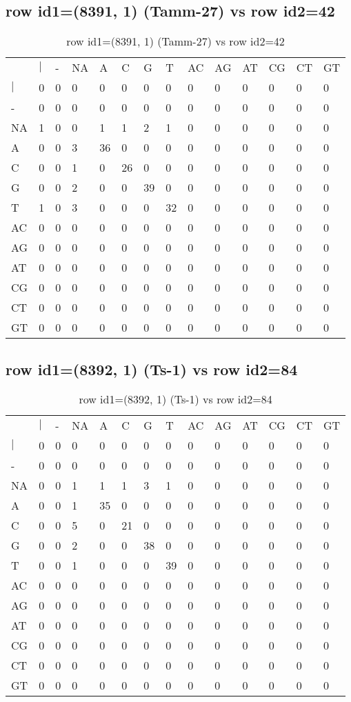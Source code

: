 \subsection{row id1=(8391, 1) (Tamm-27) vs row id2=42}
\begin{center}
\begin{longtable}{|l|l|l|l|l|l|l|l|l|l|l|l|l|l|}
\caption{row id1=(8391, 1) (Tamm-27) vs row id2=42} \label{table_dm442}\\
\hline
\\
\hline
&$|$&-&NA&A&C&G&T&AC&AG&AT&CG&CT&GT\\
$|$&0&0&0&0&0&0&0&0&0&0&0&0&0\\
-&0&0&0&0&0&0&0&0&0&0&0&0&0\\
NA&1&0&0&1&1&2&1&0&0&0&0&0&0\\
A&0&0&3&36&0&0&0&0&0&0&0&0&0\\
C&0&0&1&0&26&0&0&0&0&0&0&0&0\\
G&0&0&2&0&0&39&0&0&0&0&0&0&0\\
T&1&0&3&0&0&0&32&0&0&0&0&0&0\\
AC&0&0&0&0&0&0&0&0&0&0&0&0&0\\
AG&0&0&0&0&0&0&0&0&0&0&0&0&0\\
AT&0&0&0&0&0&0&0&0&0&0&0&0&0\\
CG&0&0&0&0&0&0&0&0&0&0&0&0&0\\
CT&0&0&0&0&0&0&0&0&0&0&0&0&0\\
GT&0&0&0&0&0&0&0&0&0&0&0&0&0\\
\hline
\end{longtable}
\end{center}

\subsection{row id1=(8392, 1) (Ts-1) vs row id2=84}
\begin{center}
\begin{longtable}{|l|l|l|l|l|l|l|l|l|l|l|l|l|l|}
\caption{row id1=(8392, 1) (Ts-1) vs row id2=84} \label{table_dm444}\\
\hline
\\
\hline
&$|$&-&NA&A&C&G&T&AC&AG&AT&CG&CT&GT\\
$|$&0&0&0&0&0&0&0&0&0&0&0&0&0\\
-&0&0&0&0&0&0&0&0&0&0&0&0&0\\
NA&0&0&1&1&1&3&1&0&0&0&0&0&0\\
A&0&0&1&35&0&0&0&0&0&0&0&0&0\\
C&0&0&5&0&21&0&0&0&0&0&0&0&0\\
G&0&0&2&0&0&38&0&0&0&0&0&0&0\\
T&0&0&1&0&0&0&39&0&0&0&0&0&0\\
AC&0&0&0&0&0&0&0&0&0&0&0&0&0\\
AG&0&0&0&0&0&0&0&0&0&0&0&0&0\\
AT&0&0&0&0&0&0&0&0&0&0&0&0&0\\
CG&0&0&0&0&0&0&0&0&0&0&0&0&0\\
CT&0&0&0&0&0&0&0&0&0&0&0&0&0\\
GT&0&0&0&0&0&0&0&0&0&0&0&0&0\\
\hline
\end{longtable}
\end{center}

